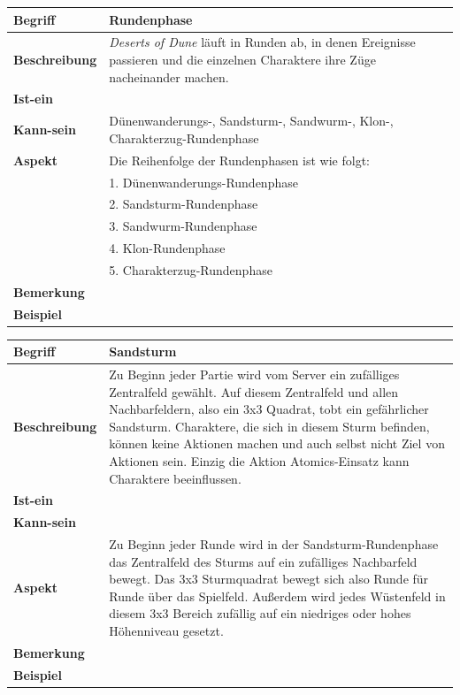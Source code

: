 \documentclass[12pt]{article}
\begin{document}
\begin{tabularx}{\linewidth}{|l|X|}
\hline
\textbf{Begriff} & \textbf{Rundenphase} \\
\hline
\textbf{Beschreibung} & \textit{Deserts of Dune} läuft in Runden ab, in denen Ereignisse passieren und die einzelnen Charaktere ihre Züge nacheinander machen. \\
\hline
\textbf{Ist-ein} & \\
\hline
\textbf{Kann-sein} & Dünenwanderungs-, Sandsturm-, Sandwurm-, Klon-, Charakterzug-Rundenphase\\
\hline
\textbf{Aspekt} & Die Reihenfolge der Rundenphasen ist wie folgt:\\
& 1. Dünenwanderungs-Rundenphase\\
& 2. Sandsturm-Rundenphase\\
& 3. Sandwurm-Rundenphase\\
& 4. Klon-Rundenphase\\
& 5. Charakterzug-Rundenphase\\
\hline
\textbf{Bemerkung} &  \\
\hline
\textbf{Beispiel} &  \\
\hline
\end{tabularx}

\begin{tabularx}{\linewidth}{|l|X|}
\hline
\textbf{Begriff} & \textbf{Sandsturm} \\
\hline
\textbf{Beschreibung} & Zu Beginn jeder Partie wird vom Server ein zufälliges Zentralfeld gewählt. Auf diesem Zentralfeld und allen Nachbarfeldern, also ein 3x3 Quadrat, tobt ein gefährlicher Sandsturm. Charaktere, die sich in diesem Sturm befinden, können keine Aktionen machen und auch selbst nicht Ziel von Aktionen sein. Einzig die Aktion Atomics-Einsatz kann Charaktere beeinflussen.\\
\hline
\textbf{Ist-ein} & \\
\hline
\textbf{Kann-sein} & \\
\hline
\textbf{Aspekt} & Zu Beginn jeder Runde wird in der Sandsturm-Rundenphase das Zentralfeld des Sturms auf ein zufälliges Nachbarfeld bewegt. Das 3x3 Sturmquadrat bewegt sich also Runde für Runde über das Spielfeld. Außerdem wird jedes Wüstenfeld in diesem 3x3 Bereich zufällig auf ein niedriges oder hohes Höhenniveau gesetzt.\\
\hline
\textbf{Bemerkung} &  \\
\hline
\textbf{Beispiel} &  \\
\hline
\end{tabularx}
\end{document}
